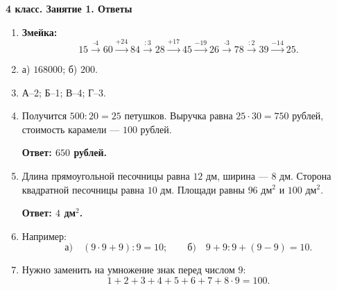 \begin{center}
    {\large\bfseries 4 класс. Занятие 1. Ответы}
\end{center}

\small

\begin{enumerate}[itemsep=0.9em]

\item \textbf{Змейка:}
\[
15 \xrightarrow{\cdot 4} 60 \xrightarrow{+24} 84
\xrightarrow{:3} 28 \xrightarrow{+17} 45 \xrightarrow{-19} 26
\xrightarrow{\cdot 3} 78 \xrightarrow{:2} 39 \xrightarrow{-14} \boxed{25}.
\]

\item а) $168000$; \qquad б) $200$.

\item А--2; \qquad Б--1; \qquad В--4; \qquad Г--3.

\item Получится $500:20=25$ петушков. Выручка равна
$25\cdot30=750$ рублей, стоимость карамели --- $100$ рублей.

\textbf{Ответ: $650$ рублей.}

\item Длина прямоугольной песочницы равна $12$ дм, ширина --- $8$ дм.
Сторона квадратной песочницы равна $10$ дм. Площади равны $96$ дм$^2$
и $100$ дм$^2$.

\textbf{Ответ: $4$ дм$^2$.}

\item Например:
\[
\text{а)}\quad (9\cdot9+9):9=10;
\qquad
\text{б)}\quad 9+9:9+(9-9)=10.
\]

\item Нужно заменить на умножение знак перед числом $9$:
\[
1+2+3+4+5+6+7+8\cdot9=100.
\]

\end{enumerate}
